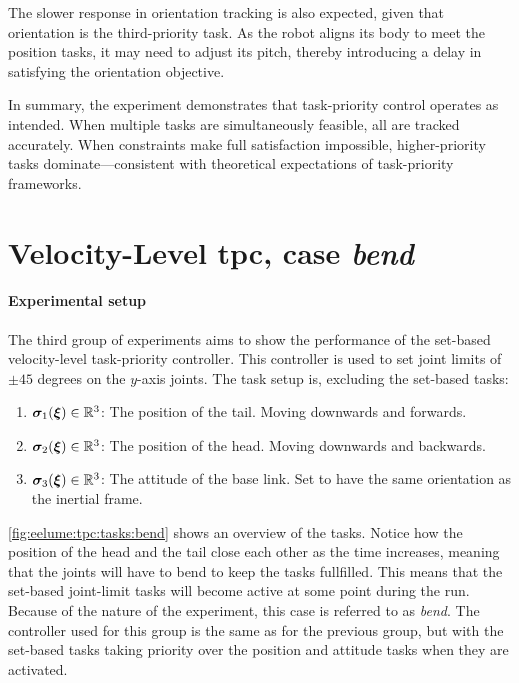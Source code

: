 The slower response in orientation tracking is also expected, given that orientation is the third-priority task. As the robot aligns its body to meet the position tasks, it may need to adjust its pitch, thereby introducing a delay in satisfying the orientation objective.

In summary, the experiment demonstrates that task-priority control operates as intended. When multiple tasks are simultaneously feasible, all are tracked accurately. When constraints make full satisfaction impossible, higher-priority tasks dominate—consistent with theoretical expectations of task-priority frameworks.


\FloatBarrier

\newpage
\section{Velocity-Level \gls{tpc}, case \textit{bend}}

\paragraph{Experimental setup}
The third group of experiments aims to show the performance of the set-based
velocity-level task-priority controller. This controller is used to set
joint limits of \(\pm 45\) degrees on the \(y\)-axis joints. The task setup is,
excluding the set-based tasks:
\begin{enumerate}
    \item \(\bm{\sigma}_1(\bm{\xi}) \in \mathbb{R}^3\): The position of the tail. Moving downwards and forwards.
    \item \(\bm{\sigma}_2(\bm{\xi}) \in \mathbb{R}^3\): The position of the head. Moving downwards and backwards.
    \item \(\bm{\sigma}_3(\bm{\xi}) \in \mathbb{R}^3\): The attitude of the base link. Set to have the same orientation as the inertial frame.
\end{enumerate}
\autoref{fig:eelume:tpc:tasks:bend} shows an overview of the tasks. Notice how
the position of the head and the tail close each other as the time increases, meaning
that the joints will have to bend to keep the tasks fullfilled. This means
that the set-based joint-limit tasks will become active at some point during the run. Because
of the nature of the experiment, this case is referred to as \textit{bend}.
The controller
used for this group is the same as for the previous group, but with the set-based
tasks taking priority over the position and attitude tasks when they are activated.

